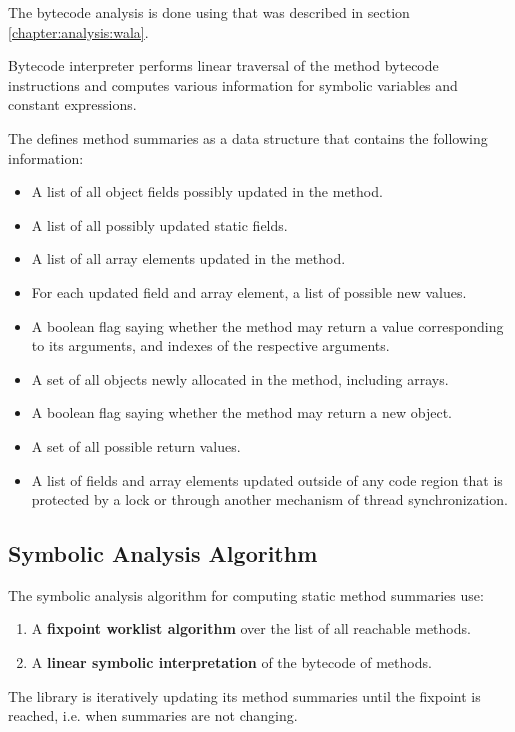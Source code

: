 The bytecode analysis is done using \citet{WalaFramework}
that was described in section \ref{chapter:analysis:wala}.

Bytecode interpreter performs linear traversal of the method bytecode instructions
and computes various information for symbolic variables and constant expressions.

The \citet{ParizekBUBEN} defines method summaries as a data structure
that contains the following information:
\begin{itemize}
  \item A list of all object fields possibly updated in the method.
  \item A list of all possibly updated static fields.
  \item A list of all array elements updated in the method.
  \item For each updated field and array element, a list of possible new values.
  \item A boolean flag saying whether the method may return a value corresponding
    to its arguments, and indexes of the respective arguments.
  \item A set of all objects newly allocated in the method, including arrays.
  \item A boolean flag saying whether the method may return a new object.
  \item A set of all possible return values.
  \item A list of fields and array elements updated outside of any code region that is
    protected by a lock or through another mechanism of thread synchronization.
\end{itemize}



\subsection{Symbolic Analysis Algorithm}

The symbolic analysis algorithm for computing static method summaries use:
\begin{enumerate}
  \item A \textbf{fixpoint worklist algorithm} over the list of all reachable methods.
  \item A \textbf{linear symbolic interpretation} of the bytecode of methods.
\end{enumerate}

The library is iteratively updating its method summaries until the fixpoint is reached, i.e.
when summaries are not changing.

